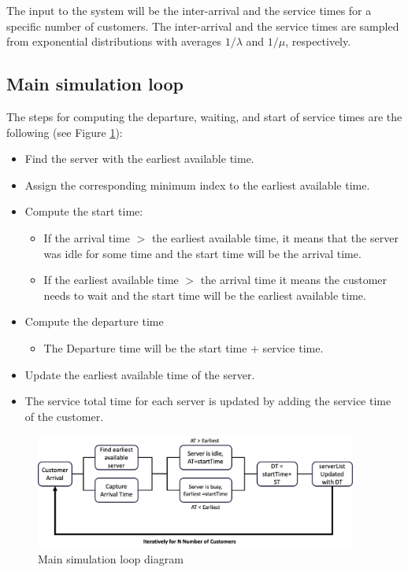 \documentclass[12pt, a4paper]{article}
\begin{document}
The input to the system will be the inter-arrival and the service times for a specific 
number of customers. The inter-arrival and the service times are sampled from exponential
distributions with averages $1/\lambda$ and $1/\mu$, respectively.

\subsection{Main simulation loop}
The steps for computing the departure, waiting, and start of service times
are the following (see Figure \ref{main_simualtion_loop_diagram}):
\begin{itemize}
  \item Find the server with the earliest available time.
  \item Assign the corresponding minimum index to the earliest available time.
  \item Compute the start time:
  \begin{itemize}
    \item If the arrival time $>$ the earliest available time, 
    it means that the server was idle for some time and 
    the start time will be the arrival time.
    \item If the earliest available time $>$ the arrival time it means the customer 
    needs to wait and the start time will be the earliest available time.
  \end{itemize}
  \item Compute the departure time
  \begin{itemize}
    \item The Departure time will be the start time + service time.
  \end{itemize}
  \item Update the earliest available time of the server.
  \item  The service total time for each server is updated 
  by adding the service time of the customer.
\end{itemize}


\begin{figure}[H]
  \centering
  \includegraphics[width=400px]{images/main_simulation_loop.png}
  \caption{Main simulation loop diagram}
  \label{main_simualtion_loop_diagram}
\end{figure}
\end{document}
